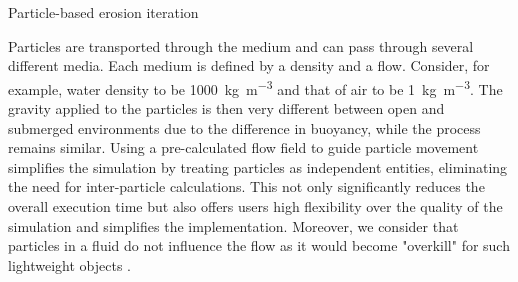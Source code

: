 \begin{algorithm}[H]
    \caption{Particle-based erosion iteration}
    \label{alg:erosion-main-loop}
    \DontPrintSemicolon
    \BlankLine

    \Return{$\Tilde{\Terrain}$}
\end{algorithm}



Particles are transported through the medium and can pass through several different media. Each medium is defined by a density and a flow. Consider, for example, water density to be \SI{1000}{\kilogram \per \cubic \meter} and that of air to be \SI{1}{\kilogram \per \cubic \meter}. The gravity applied to the particles is then very different between open and submerged environments due to the difference in buoyancy, while the process remains similar.
Using a pre-calculated flow field to guide particle movement simplifies the simulation by treating particles as independent entities, eliminating the need for inter-particle calculations. This not only significantly reduces the overall execution time but also offers users high flexibility over the quality of the simulation and simplifies the implementation. Moreover, we consider that particles in a fluid do not influence the flow as it would become "overkill" for such lightweight objects \cite{Wei2003}.

